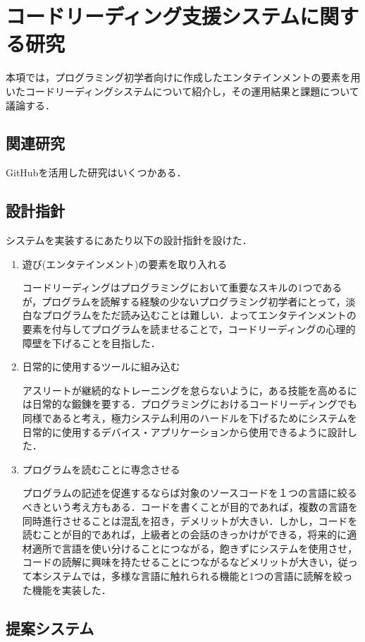 \section{コードリーディング支援システムに関する研究}
本項では，プログラミング初学者向けに作成したエンタテインメントの要素を用いたコードリーディングシステムについて紹介し，その運用結果と課題について議論する．

\subsection{関連研究}

GitHubを活用した研究はいくつかある．

\subsection{設計指針}
システムを実装するにあたり以下の設計指針を設けた．
\begin{enumerate}
  \item 遊び(エンタテインメント)の要素を取り入れる

  コードリーディングはプログラミングにおいて重要なスキルの1つであるが，プログラムを読解する経験の少ないプログラミング初学者にとって，淡白なプログラムをただ読み込むことは難しい．よってエンタテインメントの要素を付与してプログラムを読ませることで，コードリーディングの心理的障壁を下げることを目指した．
  \item 日常的に使用するツールに組み込む

  アスリートが継続的なトレーニングを怠らないように，ある技能を高めるには日常的な鍛錬を要する．プログラミングにおけるコードリーディングでも同様であると考え，極力システム利用のハードルを下げるためにシステムを日常的に使用するデバイス・アプリケーションから使用できるように設計した．
  \item プログラムを読むことに専念させる

  プログラムの記述を促進するならば対象のソースコードを１つの言語に絞るべきという考え方もある．コードを書くことが目的であれば，複数の言語を同時進行させることは混乱を招き，デメリットが大きい．しかし，コードを読むことが目的であれば，上級者との会話のきっかけができる，将来的に適材適所で言語を使い分けることにつながる，飽きずにシステムを使用させ，コードの読解に興味を持たせることにつながるなどメリットが大きい，従って本システムでは，多様な言語に触れられる機能と1つの言語に読解を絞った機能を実装した．
\end{enumerate}

\subsection{提案システム}

